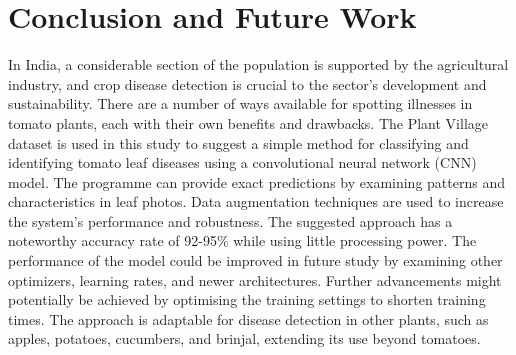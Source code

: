 \documentclass[conference]{IEEEtran}
\begin{document}
\section{Conclusion and Future Work}
In India, a considerable section of the population is supported by the agricultural industry, and crop disease detection is crucial to the sector's development and sustainability. There are a number of ways available for spotting illnesses in tomato plants, each with their own benefits and drawbacks. The Plant Village dataset is used in this study to suggest a simple method for classifying and identifying tomato leaf diseases using a convolutional neural network (CNN) model. The programme can provide exact predictions by examining patterns and characteristics in leaf photos. Data augmentation techniques are used to increase the system's performance and robustness. The suggested approach has a noteworthy accuracy rate of 92-95\% while using little processing power. The performance of the model could be improved in future study by examining other optimizers, learning rates, and newer architectures. Further advancements might potentially be achieved by optimising the training settings to shorten training times. The approach is adaptable for disease detection in other plants, such as apples, potatoes, cucumbers, and brinjal, extending its use beyond tomatoes.



\end{document}
